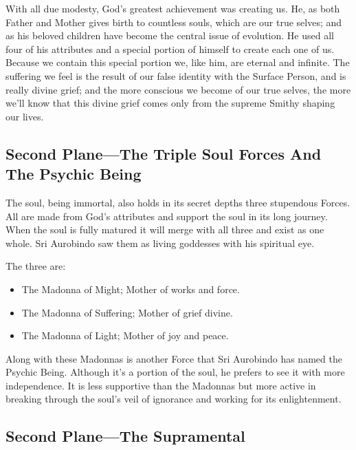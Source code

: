 \documentclass[12pt,a4paper]{book}
\begin{document}
With all due modesty, God's greatest achievement was creating us. He,
as both Father and Mother gives birth to countless souls, which are
our true selves; and as his beloved children have become the central
issue of evolution. He used all four of his attributes and a special
portion of himself to create each one of us.  Because we contain this
special portion we, like him, are eternal and infinite. The suffering
we feel is the result of our false identity with the Surface Person,
and is really divine grief; and the more conscious we become of our
true selves, the more we'll know that this divine grief comes only
from the supreme Smithy shaping our lives.


\newpage
\begin{center}\section*{Second Plane---The Triple Soul Forces And The Psychic Being}\end{center}


The soul, being immortal, also holds in its secret depths three
stupendous Forces. All are made from God's attributes and support the
soul in its long journey. When the soul is fully matured it will merge
with all three and exist as one whole. Sri Aurobindo saw them as
living goddesses with his spiritual eye.

\noindent The three are:

\begin{itemize}
\item [] The Madonna of Might; Mother of works and force.
\item [] The Madonna of Suffering; Mother of grief divine.
\item [] The Madonna of Light; Mother of joy and peace.
\end{itemize}

Along with these Madonnas is another Force that Sri Aurobindo has
named the Psychic Being. Although it's a portion of the soul, he
prefers to see it with more independence. It is less supportive than
the Madonnas but more active in breaking through the soul's veil of
ignorance and working for its enlightenment.


\newpage
\begin{center}\section*{Second Plane---The Supramental}\end{center}
\end{document}

